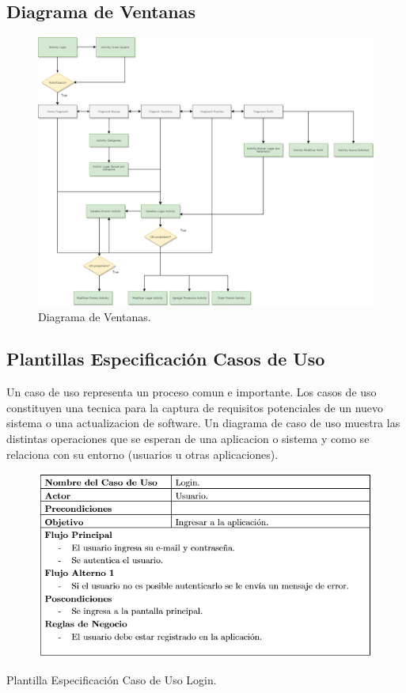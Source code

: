 \documentclass[12pt,letterpaper,openany]{book}
\begin{document}
\subsection{Diagrama de Ventanas}
\begin{figure}[H]
\begin{center}
\includegraphics[width=13cm]{./imagenes/diagrama_ventanas}
\caption{Diagrama de Ventanas.}
\end{center}
\end{figure}

\subsection{Plantillas Especificación Casos de Uso}
Un caso de uso representa un proceso comun e importante. Los casos de uso constituyen una tecnica para la captura de requisitos potenciales de un nuevo sistema o una actualizacion de software. Un diagrama de caso de uso muestra las distintas operaciones que se esperan de una aplicacion o sistema y como se relaciona con su entorno (usuarios u otras aplicaciones).

\begin{table}[H]
\begin{center}
\begin{figure}[H]
\begin{center}
\includegraphics[width=13cm]{./imagenes/PCU/login}
\end{center}
\end{figure}
\end{center}
\caption{Plantilla Especificación Caso de Uso Login.}
\end{table}
\end{document}
